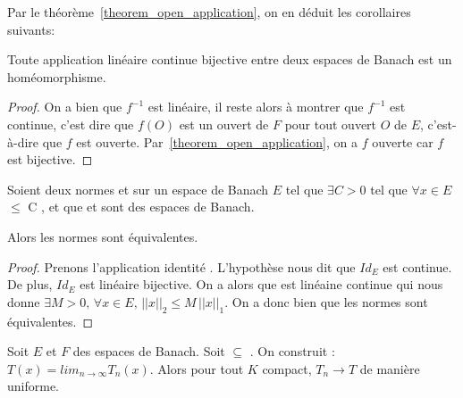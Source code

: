 Par le théorème~\ref{theorem_open_application}, on en déduit les corollaires
suivants:

\begin{corollary}
	Toute application linéaire continue bijective entre deux espaces de Banach
	est un homéomorphisme.
\end{corollary}

\begin{proof}
	On a bien que $f^{-1}$ est linéaire, il reste alors à montrer que $f^{-1}$
	est continue, c'est dire que $f(O)$ est un ouvert de $F$ pour tout ouvert
	$O$ de $E$, c'est-à-dire que $f$ est ouverte.
	Par~\ref{theorem_open_application}, on a $f$ ouverte car $f$ est bijective.
\end{proof}

\begin{corollary}
	Soient deux normes  et  sur un espace de
	Banach $E$ tel que $\exists C > 0$ tel que $\forall x \in E$
	 $\leq$ C , et que
	 et 
	sont des espaces de Banach.
	
	Alors les normes sont équivalentes.
\end{corollary}

\begin{proof}
	Prenons l'application identité . L'hypothèse nous dit que $Id_{E}$ est continue. De plus,
	$Id_{E}$ est linéaire bijective. On a alors que
	 est linéaine
	continue qui nous donne $\exists M > 0, \, \forall x \in E, \,
	||x||_{2} \leq M \, ||x||_{1}$. On a donc bien que les normes sont
	équivalentes.
\end{proof}

\begin{corollary}
	Soit $E$ et $F$ des espaces de Banach.
	Soit  $\subseteq$ . On
	construit : $T(x) = lim_{n \rightarrow \infty}
	T_{n}(x)$. Alors pour tout $K$ compact, $T_{n} \rightarrow T$ de manière
	uniforme.
\end{corollary}
